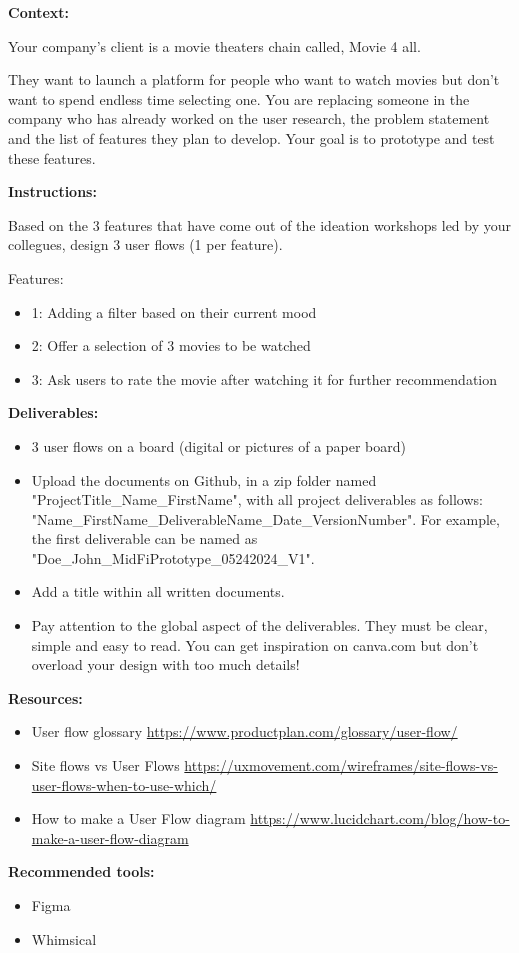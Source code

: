 \makeheaderfiles

\textbf{Context:}

Your company's client is a movie theaters chain called, Movie 4 all.

They want to launch a platform for people who want to watch movies but don't want to spend endless time selecting one.
You are replacing someone in the company who has already worked on the user research, the problem statement and the list of features they plan to develop. Your goal is to prototype and test these features.

\textbf{Instructions:}

Based on the 3 features that have come out of the ideation workshops led by your collegues, design 3 user flows (1 per feature).

Features:

\begin{itemize}
\item 1: Adding a filter based on their current mood
\item 2: Offer a selection of 3 movies to be watched
\item 3: Ask users to rate the movie after watching it for further recommendation
\end{itemize}

\textbf{Deliverables:}

\begin{itemize}
\item 3 user flows on a board (digital or pictures of a paper board)
\item Upload the documents on Github, in a zip folder named "ProjectTitle\_Name\_FirstName", with all project deliverables as follows: "Name\_FirstName\_DeliverableName\_Date\_VersionNumber".  For example, the first deliverable can be named as "Doe\_John\_MidFiPrototype\_05242024\_V1".
\item Add a title within all written documents.
\item Pay attention to the global aspect of the deliverables. They must be clear, simple and easy to read. You can get inspiration on canva.com but don't overload your design with too much details!
\end{itemize}

\textbf{Resources:}

\begin{itemize}
\item User flow glossary \url{https://www.productplan.com/glossary/user-flow/}
\item Site flows vs User Flows \url{https://uxmovement.com/wireframes/site-flows-vs-user-flows-when-to-use-which/}
\item How to make a User Flow diagram \url{https://www.lucidchart.com/blog/how-to-make-a-user-flow-diagram}
\end{itemize}

\textbf{Recommended tools:}

\begin{itemize}
\item Figma
\item Whimsical
\end{itemize}

